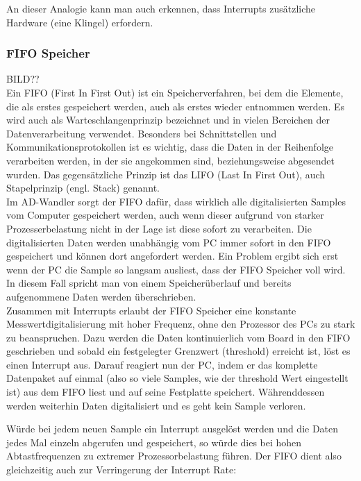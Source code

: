 \documentclass[12pt,a4paper]{scrartcl}
\begin{document}
An dieser Analogie kann man auch erkennen, dass Interrupts zusätzliche Hardware (eine Klingel) erfordern.


\subsubsection{FIFO Speicher}

BILD??\\

Ein FIFO (First In First Out) ist ein Speicherverfahren, bei dem die Elemente, die als erstes gespeichert werden, auch als erstes wieder entnommen werden. Es wird auch als Warteschlangenprinzip bezeichnet und in vielen Bereichen der Datenverarbeitung verwendet. Besonders bei Schnittstellen und Kommunikationsprotokollen ist es wichtig, dass die Daten in der Reihenfolge verarbeiten werden, in der sie angekommen sind, beziehungsweise abgesendet wurden. Das gegensätzliche Prinzip ist das LIFO (Last In First Out), auch Stapelprinzip (engl. Stack) genannt.\\

Im AD-Wandler sorgt der FIFO dafür, dass wirklich alle digitalisierten Samples vom Computer gespeichert werden, auch wenn dieser aufgrund von starker Prozesserbelastung nicht in der Lage ist diese sofort zu verarbeiten. Die digitalisierten Daten werden unabhängig vom PC immer sofort in den FIFO gespeichert und können dort angefordert werden. Ein Problem ergibt sich erst wenn der PC die Sample so langsam ausliest, dass der FIFO Speicher voll wird. In diesem Fall spricht man von einem Speicherüberlauf und bereits aufgenommene Daten werden überschrieben.\\


Zusammen mit Interrupts erlaubt der FIFO Speicher eine konstante Messwertdigitalisierung mit hoher Frequenz, ohne den Prozessor des PCs zu stark zu beanspruchen. Dazu werden die Daten kontinuierlich vom Board in den FIFO geschrieben und sobald ein festgelegter Grenzwert (threshold) erreicht ist, löst es einen Interrupt aus. Darauf reagiert nun der PC, indem er das komplette Datenpaket auf einmal (also so viele Samples, wie der threshold Wert eingestellt ist) aus dem FIFO liest und auf seine Festplatte speichert. Währenddessen werden weiterhin Daten digitalisiert und es geht kein Sample verloren.

Würde bei jedem neuen Sample ein Interrupt ausgelöst werden und die Daten jedes Mal einzeln abgerufen und gespeichert, so würde dies bei hohen Abtastfrequenzen zu extremer Prozessorbelastung führen. Der FIFO dient also gleichzeitig auch zur Verringerung der Interrupt Rate:
\end{document}
